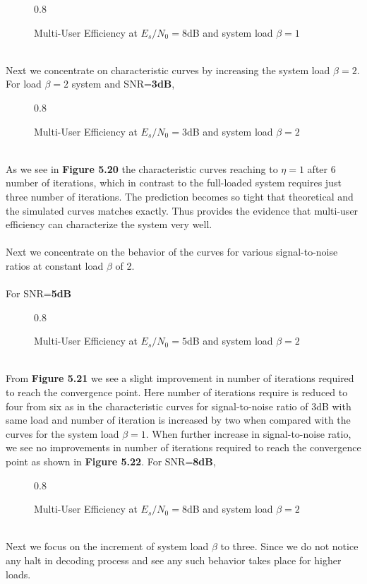\begin{figure*}[htb]
\centerline{  {0.8}}
\caption{Multi-User Efficiency at $E_s/N_0=8$dB and system load $\beta=1$}
\end{figure*}\\
Next we concentrate on characteristic curves by increasing the system load $\beta=2$.
\newpage
For load $\beta=2$ system and SNR=\textbf{3dB},\\
\begin{figure*}[htb]
\centerline{  {0.8}}
\caption{Multi-User Efficiency at $E_s/N_0=3$dB and system load $\beta=2$}
\end{figure*}\\
As we see in \textbf{Figure 5.20} the characteristic curves reaching to $\eta=1$ after 6 number of iterations, which in contrast to the full-loaded system requires just three number of iterations. The prediction becomes so tight that theoretical and the simulated curves matches exactly. Thus provides the evidence that multi-user efficiency can characterize the system very well. \\ \\
Next we concentrate on the behavior of the curves for various signal-to-noise ratios at constant load $\beta$ of 2. \\ \\
For SNR=\textbf{5dB}
\begin{figure*}[htb]
\centerline{  {0.8}}
\caption{Multi-User Efficiency at $E_s/N_0=5$dB and system load $\beta=2$}
\end{figure*}\\
From \textbf{Figure 5.21} we see a slight improvement in number of iterations required to reach the convergence point. Here number of iterations require is reduced to four from six as in the characteristic curves for signal-to-noise ratio of 3dB with same load and number of iteration is increased by two when compared with the curves for the system load $\beta=1$. When further increase in signal-to-noise ratio, we see no improvements in number of iterations required to reach the convergence point as shown in \textbf{Figure 5.22}.
\newpage
For SNR=\textbf{8dB},
\begin{figure*}[htb]
\centerline{  {0.8}}
\caption{Multi-User Efficiency at $E_s/N_0=8$dB and system load $\beta=2$}
\end{figure*}\\
Next we focus on the increment of system load $\beta$ to three. Since we do not notice any halt in decoding process and see any such behavior takes place for higher loads.
